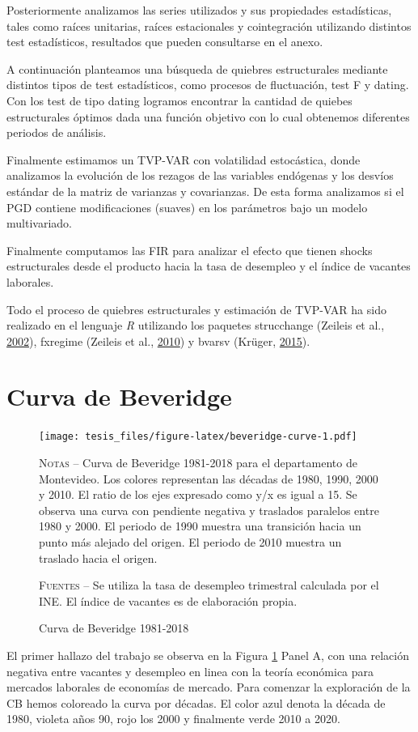 \documentclass[12pt,oneside]{reedthesis}
\begin{document}
Posteriormente analizamos las series utilizados y sus propiedades estadísticas, tales como raíces unitarias, raíces estacionales y cointegración utilizando distintos test estadísticos, resultados que pueden consultarse en el anexo.

A continuación planteamos una búsqueda de quiebres estructurales mediante distintos tipos de test estadísticos, como procesos de fluctuación, test F y dating. Con los test de tipo dating logramos encontrar la cantidad de quiebes estructurales óptimos dada una función objetivo con lo cual obtenemos diferentes periodos de análisis.

Finalmente estimamos un TVP-VAR con volatilidad estocástica, donde analizamos la evolución de los rezagos de las variables endógenas y los desvíos estándar de la matriz de varianzas y covarianzas. De esta forma analizamos si el PGD contiene modificaciones (suaves) en los parámetros bajo un modelo multivariado.

Finalmente computamos las FIR para analizar el efecto que tienen shocks estructurales desde el producto hacia la tasa de desempleo y el índice de vacantes laborales.

Todo el proceso de quiebres estructurales y estimación de TVP-VAR ha sido realizado en el lenguaje \emph{R} utilizando los paquetes strucchange (Zeileis et al., \protect\hyperlink{ref-Zeileis2002}{2002}), fxregime (Zeileis et al., \protect\hyperlink{ref-Zeileis2010}{2010}) y bvarsv (Krüger, \protect\hyperlink{ref-Kruger2015}{2015}).

\newpage

\hypertarget{curva-de-beveridge}{%
\section{Curva de Beveridge}\label{curva-de-beveridge}}
\begin{figure}
\texttt{[image: tesis\_files/figure-latex/beveridge-curve-1.pdf]}
\caption{Curva de Beveridge 1981-2018}\label{fig:beveridge-curve}\textsc{}

\footnotesize\textsc{Notas} -- Curva de Beveridge 1981-2018 para el departamento de Montevideo. Los colores representan las décadas de 1980, 1990, 2000 y 2010. El ratio de los ejes expresado como y/x es igual a 15. Se observa una curva con pendiente negativa y traslados paralelos entre 1980 y 2000. El periodo de 1990 muestra una transición hacia un punto más alejado del origen. El periodo de 2010 muestra un traslado hacia el origen.

\textsc{Fuentes} -- Se utiliza la tasa de desempleo trimestral calculada por el INE. El índice de vacantes es de elaboración propia.
\end{figure}
El primer hallazo del trabajo se observa en la Figura \ref{fig:beveridge-curve} Panel A, con una relación negativa entre vacantes y desempleo en linea con la teoría económica para mercados laborales de economías de mercado. Para comenzar la exploración de la CB hemos coloreado la curva por décadas. El color azul denota la década de 1980, violeta años 90, rojo los 2000 y finalmente verde 2010 a 2020.
\end{document}
